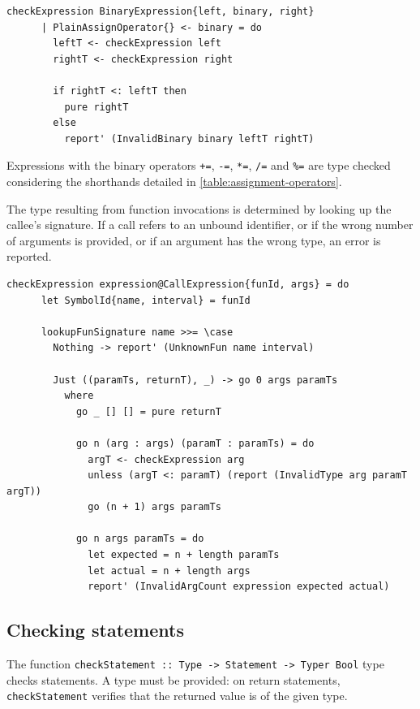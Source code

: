 \documentclass[UdineBachThesis,american,11pt]{PhdThesis}
\begin{document}
  \begin{Verbatim}[gobble=4,fontsize=\small]
    checkExpression BinaryExpression{left, binary, right}
      | PlainAssignOperator{} <- binary = do
        leftT <- checkExpression left
        rightT <- checkExpression right

        if rightT <: leftT then
          pure rightT
        else
          report' (InvalidBinary binary leftT rightT)
  \end{Verbatim}

  Expressions with the binary operators \mbox{\texttt{+=}}, \mbox{\texttt{-=}},
  \mbox{\texttt{*=}}, \mbox{\texttt{/=}} and \mbox{\texttt{\%=}} are type
  checked considering the shorthands detailed in
  \autoref{table:assignment-operators}.

  The type resulting from function invocations is determined by looking up the
  callee's signature. If a call refers to an unbound identifier, or if the wrong
  number of arguments is provided, or if an argument has the wrong type, an
  error is reported.

  \begin{Verbatim}[gobble=4,fontsize=\small]
    checkExpression expression@CallExpression{funId, args} = do
      let SymbolId{name, interval} = funId

      lookupFunSignature name >>= \case
        Nothing -> report' (UnknownFun name interval)

        Just ((paramTs, returnT), _) -> go 0 args paramTs
          where
            go _ [] [] = pure returnT

            go n (arg : args) (paramT : paramTs) = do
              argT <- checkExpression arg
              unless (argT <: paramT) (report (InvalidType arg paramT argT))
              go (n + 1) args paramTs

            go n args paramTs = do
              let expected = n + length paramTs
              let actual = n + length args
              report' (InvalidArgCount expression expected actual)
  \end{Verbatim}

  \subsection{Checking statements}

  The function \mbox{\texttt{checkStatement :: Type -> Statement -> Typer Bool}}
  type checks statements. A type must be provided: on return statements,
  \mbox{\texttt{checkStatement}} verifies that the returned value is of the
  given type.
\end{document}

